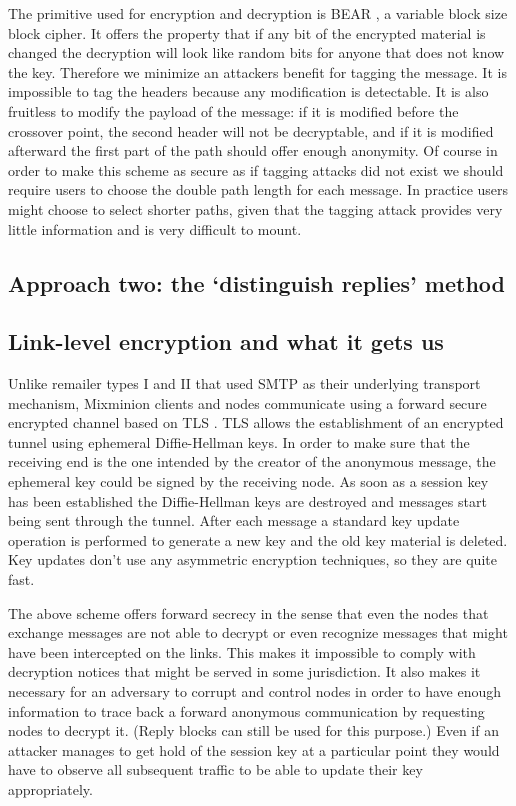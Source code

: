 \documentclass{llncs}
\begin{document}
The primitive used for encryption and decryption is BEAR \cite{BEAR},
a variable block size block cipher. It offers the property that if any
bit of the encrypted material is changed the decryption will look like
random bits for anyone that does not know the key. Therefore we minimize
an attackers benefit for tagging the message. It is impossible to tag the
headers because any modification is detectable. It is also fruitless to
modify the payload of the message: if it is modified before the crossover
point, the second header will not be decryptable, and if it is modified
afterward the first part of the path should offer enough anonymity. Of
course in order to make this scheme as secure as if tagging attacks did
not exist we should require users to choose the double path length for
each message. In practice users might choose to select shorter paths,
given that the tagging attack provides very little information and is
very difficult to mount.

\subsection{Approach two: the `distinguish replies' method}


\subsection{Link-level encryption and what it gets us}

Unlike remailer types I and II that used SMTP as their underlying 
transport mechanism, Mixminion clients and nodes communicate 
using a forward secure encrypted channel based on TLS \cite{TLS}.
TLS allows the establishment of an encrypted tunnel using ephemeral 
Diffie-Hellman keys. In order to make sure that the receiving end is the 
one intended by the creator of the anonymous message, the ephemeral key could be 
signed by the receiving node. As soon as a session key has been established 
the Diffie-Hellman keys are destroyed and messages start being sent through the
tunnel. After each message a standard key update operation is performed to generate 
a new key and the old key material is deleted. Key updates don't use any
asymmetric encryption techniques, so they are quite fast.

The above scheme offers forward secrecy in the sense that even the nodes 
that exchange messages are not able to decrypt or even recognize 
messages that might have been intercepted on the links. This makes it impossible 
to comply with decryption notices that might be served in some jurisdiction.
It also makes it necessary for an adversary to corrupt and control nodes in order
to have enough information to trace back a forward anonymous communication by 
requesting nodes to decrypt it. (Reply blocks can still be used for this purpose.)
Even if an attacker manages to get hold of the session key at a particular point
they would have to observe all subsequent traffic to be able to update their key
appropriately. 
\end{document}
